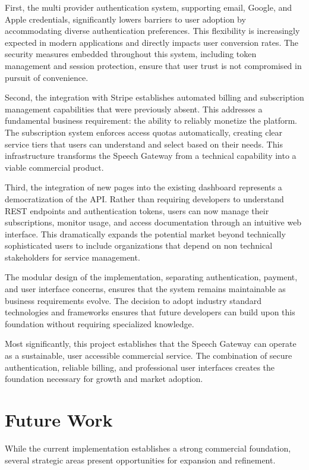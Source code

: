 First, the multi provider authentication system, supporting email, Google, and Apple credentials, significantly lowers barriers to user adoption by accommodating diverse authentication preferences. This flexibility is increasingly expected in modern applications and directly impacts user conversion rates. The security measures embedded throughout this system, including token management and session protection, ensure that user trust is not compromised in pursuit of convenience.

Second, the integration with Stripe establishes automated billing and subscription management capabilities that were previously absent. This addresses a fundamental business requirement: the ability to reliably monetize the platform. The subscription system enforces access quotas automatically, creating clear service tiers that users can understand and select based on their needs. This infrastructure transforms the Speech Gateway from a technical capability into a viable commercial product.

Third, the integration of new pages into the existing dashboard represents a democratization of the API. Rather than requiring developers to understand REST endpoints and authentication tokens, users can now manage their subscriptions, monitor usage, and access documentation through an intuitive web interface. This dramatically expands the potential market beyond technically sophisticated users to include organizations that depend on non technical stakeholders for service management.

The modular design of the implementation, separating authentication, payment, and user interface concerns, ensures that the system remains maintainable as business requirements evolve. The decision to adopt industry standard technologies and frameworks ensures that future developers can build upon this foundation without requiring specialized knowledge.

Most significantly, this project establishes that the Speech Gateway can operate as a sustainable, user accessible commercial service. The combination of secure authentication, reliable billing, and professional user interfaces creates the foundation necessary for growth and market adoption.

\section{Future Work}

While the current implementation establishes a strong commercial foundation, several strategic areas present opportunities for expansion and refinement.

